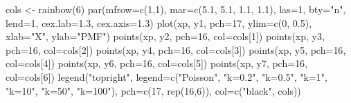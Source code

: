 \documentclass[
  13,
  letterpaper,
]{report}
\newenvironment{Shaded}{\begin{snugshade}}{\end{snugshade}}
\newcommand{\AttributeTok}[1]{\textcolor[rgb]{0.40,0.45,0.13}{#1}}
\newcommand{\DecValTok}[1]{\textcolor[rgb]{0.68,0.00,0.00}{#1}}
\newcommand{\FloatTok}[1]{\textcolor[rgb]{0.68,0.00,0.00}{#1}}
\newcommand{\FunctionTok}[1]{\textcolor[rgb]{0.28,0.35,0.67}{#1}}
\newcommand{\NormalTok}[1]{\textcolor[rgb]{0.00,0.23,0.31}{#1}}
\newcommand{\OtherTok}[1]{\textcolor[rgb]{0.00,0.23,0.31}{#1}}
\newcommand{\StringTok}[1]{\textcolor[rgb]{0.13,0.47,0.30}{#1}}
\begin{document}
\begin{Shaded}
\begin{Highlighting}[]
\NormalTok{cols }\OtherTok{\textless{}{-}} \FunctionTok{rainbow}\NormalTok{(}\DecValTok{6}\NormalTok{)}
\FunctionTok{par}\NormalTok{(}\AttributeTok{mfrow=}\FunctionTok{c}\NormalTok{(}\DecValTok{1}\NormalTok{,}\DecValTok{1}\NormalTok{), }\AttributeTok{mar=}\FunctionTok{c}\NormalTok{(}\FloatTok{5.1}\NormalTok{, }\FloatTok{5.1}\NormalTok{, }\FloatTok{1.1}\NormalTok{, }\FloatTok{1.1}\NormalTok{),}
    \AttributeTok{las=}\DecValTok{1}\NormalTok{, }\AttributeTok{bty=}\StringTok{"n"}\NormalTok{, }\AttributeTok{lend=}\DecValTok{1}\NormalTok{,}
    \AttributeTok{cex.lab=}\FloatTok{1.3}\NormalTok{, }\AttributeTok{cex.axis=}\FloatTok{1.3}\NormalTok{)}
\FunctionTok{plot}\NormalTok{(xp, y1, }\AttributeTok{pch=}\DecValTok{17}\NormalTok{, }\AttributeTok{ylim=}\FunctionTok{c}\NormalTok{(}\DecValTok{0}\NormalTok{, }\FloatTok{0.5}\NormalTok{), }\AttributeTok{xlab=}\StringTok{"X"}\NormalTok{, }\AttributeTok{ylab=}\StringTok{"PMF"}\NormalTok{)}
\FunctionTok{points}\NormalTok{(xp, y2, }\AttributeTok{pch=}\DecValTok{16}\NormalTok{, }\AttributeTok{col=}\NormalTok{cols[}\DecValTok{1}\NormalTok{])}
\FunctionTok{points}\NormalTok{(xp, y3, }\AttributeTok{pch=}\DecValTok{16}\NormalTok{, }\AttributeTok{col=}\NormalTok{cols[}\DecValTok{2}\NormalTok{])}
\FunctionTok{points}\NormalTok{(xp, y4, }\AttributeTok{pch=}\DecValTok{16}\NormalTok{, }\AttributeTok{col=}\NormalTok{cols[}\DecValTok{3}\NormalTok{])}
\FunctionTok{points}\NormalTok{(xp, y5, }\AttributeTok{pch=}\DecValTok{16}\NormalTok{, }\AttributeTok{col=}\NormalTok{cols[}\DecValTok{4}\NormalTok{])}
\FunctionTok{points}\NormalTok{(xp, y6, }\AttributeTok{pch=}\DecValTok{16}\NormalTok{, }\AttributeTok{col=}\NormalTok{cols[}\DecValTok{5}\NormalTok{])}
\FunctionTok{points}\NormalTok{(xp, y7, }\AttributeTok{pch=}\DecValTok{16}\NormalTok{, }\AttributeTok{col=}\NormalTok{cols[}\DecValTok{6}\NormalTok{])}
\FunctionTok{legend}\NormalTok{(}\StringTok{"topright"}\NormalTok{, }
\AttributeTok{legend=}\FunctionTok{c}\NormalTok{(}\StringTok{"Poisson"}\NormalTok{, }\StringTok{"k=0.2"}\NormalTok{, }\StringTok{"k=0.5"}\NormalTok{, }\StringTok{"k=1"}\NormalTok{, }\StringTok{"k=10"}\NormalTok{, }
\StringTok{"k=50"}\NormalTok{, }\StringTok{"k=100"}\NormalTok{),}
     \AttributeTok{pch=}\FunctionTok{c}\NormalTok{(}\DecValTok{17}\NormalTok{, }\FunctionTok{rep}\NormalTok{(}\DecValTok{16}\NormalTok{,}\DecValTok{6}\NormalTok{)), }\AttributeTok{col=}\FunctionTok{c}\NormalTok{(}\StringTok{"black"}\NormalTok{, cols))}
\end{Highlighting}
\end{Shaded}
\end{document}
